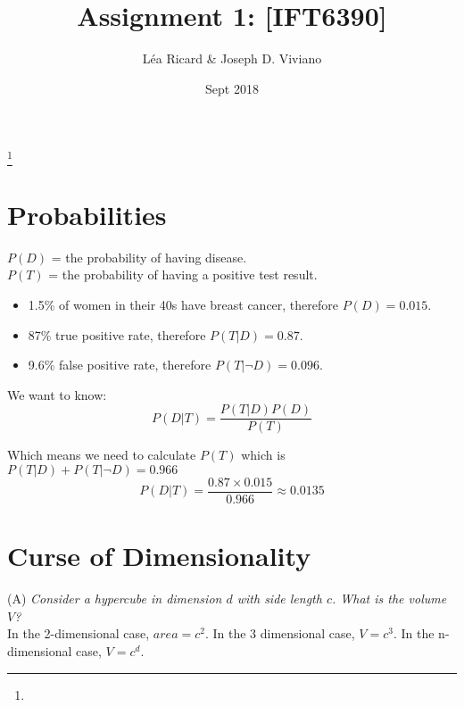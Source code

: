 \documentclass{amsart}
\theoremstyle{definition}
\theoremstyle{remark}
\numberwithin{equation}{section}
\begin{document}
\title{Assignment 1: [IFT6390]}

\author{L\'ea Ricard \& Joseph D. Viviano}
\address{Universit\'e de Montr\'eal}
\curraddr{}
\thanks{}
\date{Sept 2018}

\maketitle

\section{Probabilities}

$P(D)$ = the probability of having disease. \\
$P(T)$ = the probability of having a positive test result. \\

\begin{itemize}
    \item 1.5\% of women in their 40s have breast cancer, therefore $P(D) = 0.015$.
    \item 87\% true positive rate, therefore $P(T|D) = 0.87$.
    \item 9.6\% false positive rate, therefore $P(T|\neg D) = 0.096$.
\end{itemize}

We want to know: \\

\begin{equation}
P(D|T) = \frac{P(T|D) P(D)}{P(T)}
\end{equation}

Which means we need to calculate $P(T)$ which is $P(T|D) + P(T |\neg D) = 0.966$ \\

\begin{equation}
P(D|T) = \frac{0.87 \times 0.015}{0.966} \approx 0.0135
\end{equation}

\section{Curse of Dimensionality}

(A) \textit{Consider a hypercube in dimension $d$ with side length $c$. What is the volume $V$?} \\

In the 2-dimensional case, $area = c^2$. In the 3 dimensional case, $V = c^3$. In the n-dimensional case, $V = c^d$. \\
\end{document}
